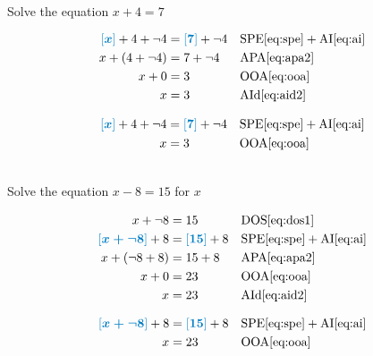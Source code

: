 \begin{example}[id:20141206-101632] \label{20141206-101632} \hfill \\

Solve the equation $x+4=7$

\soln

\solnsteps
\begin{align*}
\farg{x} +4 + \neg 4  &= \farg{7} + \neg 4  && \text{SPE} \eqref{eq:spe} + \text{AI} \eqref{eq:ai} \\
x + (4+\neg 4) &= 7 + \neg 4  && \text{APA} \eqref{eq:apa2} \\
x + 0 &= 3  && \text{OOA} \eqref{eq:ooa} \\
x  &= 3  && \text{AId} \eqref{eq:aid2}  
\end{align*}

\soln

\lesssteps

\begin{align*}
\farg{x} +4 + \neg 4  &= \farg{7} + \neg 4  && \text{SPE} \eqref{eq:spe} + \text{AI} \eqref{eq:ai} \\
x &= 3  && \text{OOA} \eqref{eq:ooa} 
\end{align*}
\end{example}

\begin{example}[id:20141206-101107] \label{20141206-101107} \hfill \\

Solve the equation $x-8=15$ for $x$

\soln

\solnsteps
\begin{align*}
x+ \neg 8 &= 15  && \text{DOS} \eqref{eq:dos1} \\
\farg{x+ \neg 8} + 8  &= \farg{15} + 8  && \text{SPE} \eqref{eq:spe} + \text{AI} \eqref{eq:ai} \\
x + (\neg 8+ 8) &= 15 + 8  && \text{APA} \eqref{eq:apa2} \\
x + 0 &= 23  && \text{OOA} \eqref{eq:ooa} \\
x  &= 23  && \text{AId} \eqref{eq:aid2} 
\end{align*}

\soln

\lesssteps
\begin{align*}
\farg{x+ \neg 8} + 8  &= \farg{15} + 8  && \text{SPE} \eqref{eq:spe} + \text{AI} \eqref{eq:ai} \\
x &= 23  && \text{OOA} \eqref{eq:ooa} \\
\end{align*}
\end{example}

